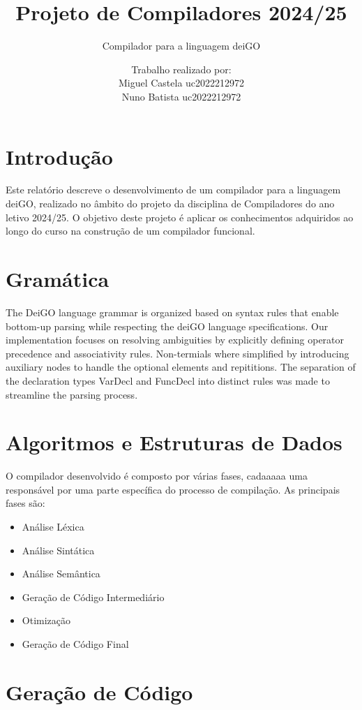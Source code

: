 \documentclass[12pt]{article}
\title{Projeto de Compiladores 2024/25}
\subtitle{Compilador para a linguagem deiGO}
\author{Trabalho realizado por:\\
Miguel Castela uc2022212972 \\
Nuno Batista uc2022212972}
\date{}
\begin{document}
\maketitle

\newpage

\section{Introdução}
Este relatório descreve o desenvolvimento de um compilador para a linguagem deiGO, realizado no âmbito do projeto da disciplina de Compiladores do ano letivo 2024/25. O objetivo deste projeto é aplicar os conhecimentos adquiridos ao longo do curso na construção de um compilador funcional.

\section{Gramática}
The DeiGO language grammar is organized based on syntax rules that enable bottom-up parsing while respecting the deiGO language specifications. Our implementation focuses on resolving ambiguities by explicitly defining operator precedence and associativity rules. Non-termials where simplified by introducing auxiliary nodes to handle the optional elements and repititions. The separation of the declaration types VarDecl and FuncDecl into distinct rules was made to streamline the parsing process.



\section{Algoritmos e Estruturas de Dados}
O compilador desenvolvido é composto por várias fases, cadaaaaa uma responsável por uma parte específica do processo de compilação. As principais fases são:

\begin{itemize}
    \item Análise Léxica
    \item Análise Sintática
    \item Análise Semântica
    \item Geração de Código Intermediário
    \item Otimização
    \item Geração de Código Final
\end{itemize}

\section{Geração de Código}
\end{document}
